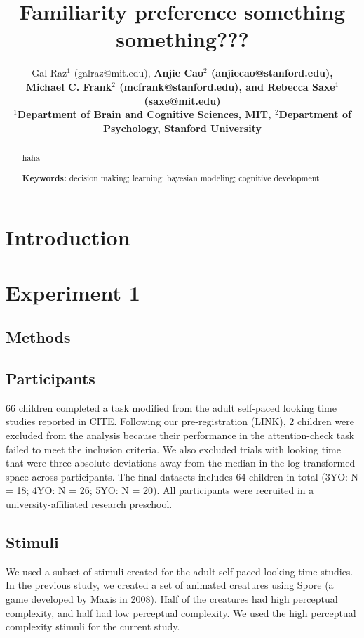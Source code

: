 \documentclass[10pt, letterpaper]{article}
\title{Familiarity preference something something???}
\author{Gal Raz$^1$ (galraz@mit.edu), \bf{Anjie Cao$^2$  (anjiecao@stanford.edu)},\\ \bf{Michael C. Frank$^2$ (mcfrank@stanford.edu)},
 and \bf{Rebecca Saxe$^1$ (saxe@mit.edu)} \\
$^1$Department of Brain and Cognitive Sciences, MIT, $^2$Department of Psychology, Stanford University \\ }
\begin{document}
\maketitle

\begin{abstract}
haha

\textbf{Keywords:}
decision making; learning; bayesian modeling; cognitive development
\end{abstract}

\hypertarget{introduction}{%
\section{Introduction}\label{introduction}}

\hypertarget{experiment-1}{%
\section{Experiment 1}\label{experiment-1}}

\hypertarget{methods}{%
\subsection{Methods}\label{methods}}

\hypertarget{participants}{%
\subsection{Participants}\label{participants}}

66 children completed a task modified from the adult self-paced looking
time studies reported in CITE. Following our pre-registration (LINK), 2
children were excluded from the analysis because their performance in
the attention-check task failed to meet the inclusion criteria. We also
excluded trials with looking time that were three absolute deviations
away from the median in the log-transformed space across participants.
The final datasets includes 64 children in total (3YO: N = 18; 4YO: N =
26; 5YO: N = 20). All participants were recruited in a
university-affiliated research preschool.

\hypertarget{stimuli}{%
\subsection{Stimuli}\label{stimuli}}

We used a subset of stimuli created for the adult self-paced looking
time studies. In the previous study, we created a set of animated
creatures using Spore (a game developed by Maxis in 2008). Half of the
creatures had high perceptual complexity, and half had low perceptual
complexity. We used the high perceptual complexity stimuli for the
current study.
\end{document}
